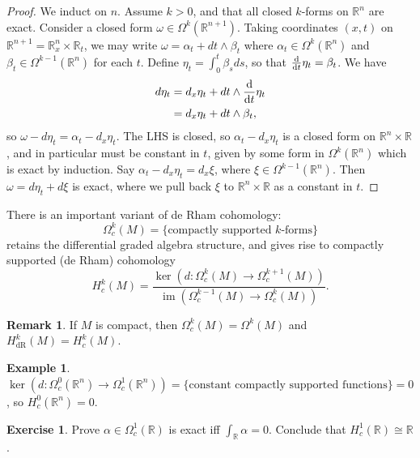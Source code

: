 \documentclass{article}
\theoremstyle{definition}
\newtheorem*{example}{Example}
\newtheorem*{remark}{Remark}
\newtheorem*{exercise}{Exercise}
\DeclareMathOperator{\im}{im}
\newcommand{\dR}{\mathrm{dR}}
\newcommand{\R}{\mathbb{R}}
\begin{document}
\begin{proof}
    We induct on $n$. Assume $k>0$, and that all closed $k$-forms on $\R^n$ are
    exact. Consider a closed form $\omega\in\Omega^k(\R^{n+1})$. Taking
    coordinates $(x,t)$ on $\R^{n+1}=\R^n_x\times\R_t$, we may write
    $\omega=\alpha_t+dt\wedge\beta_t$ where $\alpha_t\in\Omega^k(\R^n)$ and
    $\beta_t\in\Omega^{k-1}(\R^n)$ for each $t$. Define
    $\eta_t=\int_0^t\beta_sds$, so that $\odv{}{t}\eta_t=\beta_t$. We have
    \begin{align*}
        d\eta_t
            &= d_x\eta_t + dt\wedge\odv{}{t}\eta_t \\
            &= d_x\eta_t + dt\wedge\beta_t,
    \end{align*}
    so $\omega-d\eta_t=\alpha_t-d_x\eta_t$. The LHS is closed, so
    $\alpha_t-d_x\eta_t$ is a closed form on $\R^n\times\R$, and in particular
    must be constant in $t$, given by some form in $\Omega^k(\R^n)$ which is
    exact by induction. Say $\alpha_t-d_x\eta_t=d_x\xi$, where
    $\xi\in\Omega^{k-1}(\R^n)$. Then $\omega=d\eta_t+d\xi$ is exact, where we
    pull back $\xi$ to $\R^n\times\R$ as a constant in $t$.
\end{proof}

There is an important variant of de Rham cohomology:
\begin{equation*}
    \Omega^k_c(M) = \{\text{compactly supported $k$-forms}\}
\end{equation*}
retains the differential graded algebra structure, and gives rise to compactly
supported (de Rham) cohomology
\begin{equation*}
    H^k_c(M) = \frac{\ker(d:\Omega^k_c(M)\to\Omega^{k+1}_c(M))}
        {\im(\Omega^{k-1}_c(M)\to\Omega^k_c(M))}.
\end{equation*}

\begin{remark}
    If $M$ is compact, then $\Omega^k_c(M)=\Omega^k(M)$ and
    $H^k_\dR(M)=H^k_c(M)$.
\end{remark}

\begin{example}
    $\ker(d:\Omega^0_c(\R^n)\to\Omega^1_c(\R^n))
    =\{\text{constant compactly supported functions}\}=0$, so $H^0_c(\R^n)=0$.
\end{example}

\begin{exercise}
    Prove $\alpha\in\Omega^1_c(\R)$ is exact iff $\int_\R\alpha=0$. Conclude
    that $H^1_c(\R)\cong\R$.
\end{exercise}
\end{document}
